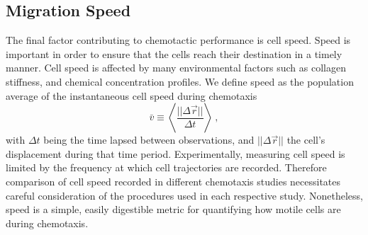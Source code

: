 %
%

\subsection{Migration Speed}

The final factor contributing to chemotactic performance is cell speed. Speed is important in order to ensure that the cells reach their destination in a timely manner. Cell speed is affected by many environmental factors such as collagen stiffness, and chemical concentration profiles. We define speed as the population average of the instantaneous cell speed during chemotaxis
\begin{equation}
    \bar{v} \equiv \left\langle \frac{||\Delta\vec{r}||}{\Delta t} \right\rangle \ ,
\end{equation}
with $\Delta t$ being the time lapsed between observations, and $||\Delta\vec{r}||$ the cell's displacement during that time period.
Experimentally, measuring cell speed is limited by the frequency at which cell trajectories are recorded. Therefore comparison of cell speed recorded in different chemotaxis studies necessitates careful consideration of the procedures used in each respective study. Nonetheless, speed is a simple, easily digestible metric for quantifying how motile cells are during chemotaxis.


